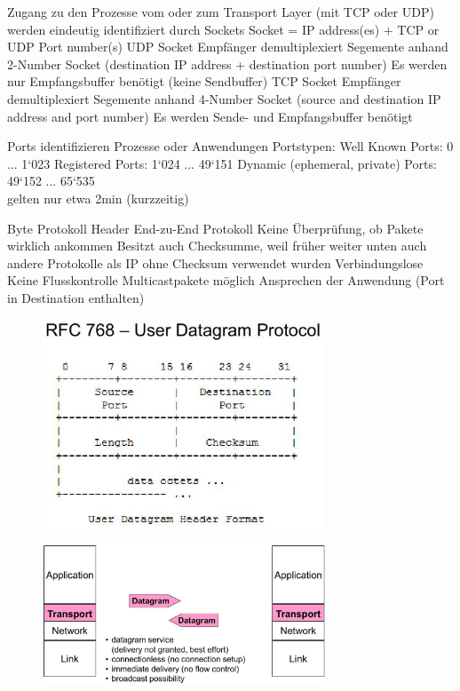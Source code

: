\documentclass[ngerman,a4paper,12pt]{scrreprt}
\begin{document}
\ul
	\li Zugang zu den Prozesse vom oder zum Transport Layer
(mit TCP oder UDP) werden eindeutig identifiziert durch
Sockets
	\li Socket = IP address(es) + TCP or UDP Port number(s)
	\li UDP Socket
		\ul
			\li Empfänger demultiplexiert Segemente anhand 2-Number Socket
(destination IP address + destination port number)
			\li Es werden nur Empfangsbuffer benötigt (keine Sendbuffer)
		\ulE
	\li TCP Socket
		\ul
			\li Empfänger demultiplexiert Segemente anhand 4-Number Socket
(source and destination IP address and port number)
			\li Es werden Sende- und Empfangsbuffer benötigt
		\ulE
\ulE

\ul
	\li Ports identifizieren Prozesse oder Anwendungen
	\li Portstypen: 
		\ul
			\li  Well Known Ports: 0 ... 1‘023
 			\li Registered Ports: 1‘024 ... 49‘151
 			\li Dynamic (ephemeral, private) Ports: 49‘152 ... 65‘535\\
 			gelten nur etwa 2min (kurzzeitig)
		\ulE
\ulE

\ul
	 Byte Protokoll Header
	\li End-zu-End Protokoll
	\li Keine Überprüfung, ob Pakete wirklich ankommen
	\li Besitzt auch Checksumme, weil früher weiter unten auch andere Protokolle als IP ohne Checksum verwendet wurden
	\li Verbindungslose
	\li Keine Flusskontrolle
	\li Multicastpakete möglich
	\li Ansprechen der Anwendung (Port in Destination enthalten)
\ulE

\begin{figure}[H]
	\centering
	\includegraphics[width=0.75\textwidth]{img/V11.2.jpg}
	\caption{}
	\label{}
\end{figure}

\begin{figure}[H]
	\centering
	\includegraphics[width=0.75\textwidth]{img/V11.3.jpg}
	\caption{}
	\label{}
\end{figure}
\end{document}
